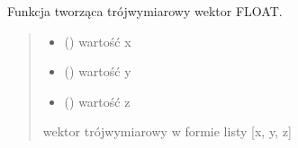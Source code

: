 \documentclass[a4paper,10pt,openany,english]{sphinxmanual}
\begin{document}
\begin{fulllineitems}
\label{\detokenize{js/js-functions:vector3f}}
\pysigstartsignatures
\pysiglinewithargsret
{}
{\sphinxparamcomma {}\sphinxparamcomma {}}
{}
\pysigstopsignatures
\sphinxAtStartPar
Funkcja tworząca trójwymiarowy wektor FLOAT.
\begin{quote}\begin{description}
\begin{itemize}
\item {} 
\sphinxAtStartPar
{} () \textendash{} wartość x

\item {} 
\sphinxAtStartPar
{} () \textendash{} wartość y

\item {} 
\sphinxAtStartPar
{} () \textendash{} wartość z

\end{itemize}

\sphinxAtStartPar
wektor trójwymiarowy w formie listy {[}x, y, z{]}

\end{description}\end{quote}

\end{fulllineitems}

\end{document}

